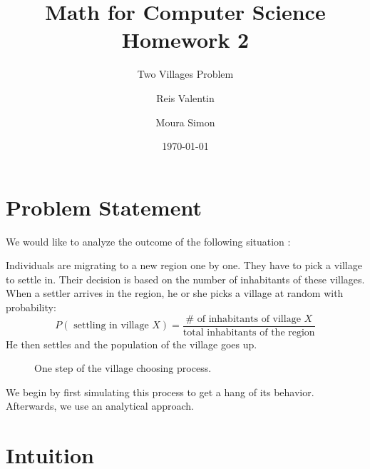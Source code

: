 \documentclass{beamer}
\title{Math for Computer Science Homework 2}
\subtitle{Two Villages Problem}
\author{Reis Valentin  \and Moura Simon}
\date{\today}
\begin{document}
\maketitle

\newpage


\section{Problem Statement}
We would like to analyze the outcome of the following situation :

Individuals are migrating to a new region one by one. They have to pick a village to settle in. Their decision is based on the number of inhabitants of these villages. When a settler arrives in the region, he or she picks a village at random with probability:
\[
    P(\text{ settling in village } X)=\frac{\# \text{ of inhabitants of village } X}{\text{total inhabitants of the region}}
\]
He then settles and the population of the village goes up.

\usetikzlibrary{arrows,positioning}
\begin{figure}[H]
    \centering
    \caption{One step of the village choosing process.}
    \label{fig:probchoice}
\end{figure}

We begin by first simulating this process to get a hang of its behavior. Afterwards, we use an analytical approach.
\section{Intuition}
\label{sec:intuition}
\end{document}
